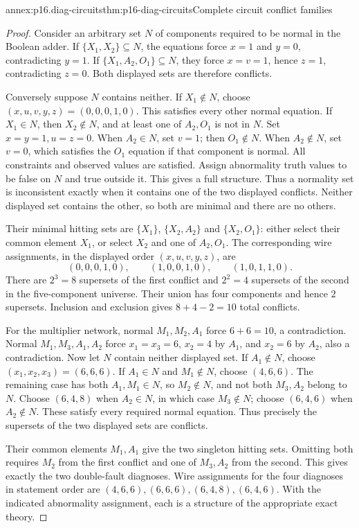 \begin{annexitem}{annex:p16.diag-circuits}{thm:p16-diag-circuits}{Complete circuit conflict families}
\begin{proof}
Consider an arbitrary set \(N\) of components required
to be normal in the Boolean adder. If
\(\{X_1,X_2\}\subseteq N\), the equations force
\(x=1\) and \(y=0\), contradicting \(y=1\).
If \(\{X_1,A_2,O_1\}\subseteq N\), they force
\(x=v=1\), hence \(z=1\), contradicting \(z=0\).
Both displayed sets are therefore conflicts.

Conversely suppose \(N\) contains neither.
If \(X_1\notin N\), choose
\((x,u,v,y,z)=(0,0,0,1,0)\). This satisfies every
other normal equation. If \(X_1\in N\), then
\(X_2\notin N\), and at least one of \(A_2,O_1\)
is not in \(N\). Set \(x=y=1,u=z=0\).
When \(A_2\in N\), set \(v=1\); then \(O_1\notin N\).
When \(A_2\notin N\), set \(v=0\), which satisfies
the \(O_1\) equation if that component is normal.
All constraints and observed values are satisfied.
Assign abnormality truth values to be false on \(N\)
and true outside it. This gives a full structure.
Thus a normality set is inconsistent exactly when
it contains one of the two displayed conflicts.
Neither displayed set contains the other, so both
are minimal and there are no others.

Their minimal hitting sets are \(\{X_1\}\),
\(\{X_2,A_2\}\) and \(\{X_2,O_1\}\):
either select their common element \(X_1\), or
select \(X_2\) and one of \(A_2,O_1\).
The corresponding wire assignments, in the displayed
order \((x,u,v,y,z)\), are
\[
       (0,0,0,1,0),\qquad(1,0,0,1,0),
                           \qquad(1,0,1,1,0).
\]
There are \(2^3=8\) supersets of the first conflict
and \(2^2=4\) supersets of the second in the
five-component universe. Their union has four
components and hence \(2\) supersets. Inclusion
and exclusion gives \(8+4-2=10\) total conflicts.

For the multiplier network, normal
\(M_1,M_2,A_1\) force \(6+6=10\), a contradiction.
Normal \(M_1,M_3,A_1,A_2\) force
\(x_1=x_3=6\), \(x_2=4\) by \(A_1\), and
\(x_2=6\) by \(A_2\), also a contradiction.
Now let \(N\) contain neither displayed set.
If \(A_1\notin N\), choose \((x_1,x_2,x_3)=(6,6,6)\).
If \(A_1\in N\) and \(M_1\notin N\), choose
\((4,6,6)\). The remaining case has both
\(A_1,M_1\in N\), so \(M_2\notin N\), and
not both \(M_3,A_2\) belong to \(N\).
Choose \((6,4,8)\) when \(A_2\in N\), in which
case \(M_3\notin N\); choose \((6,4,6)\)
when \(A_2\notin N\). These satisfy every required
normal equation. Thus precisely the supersets of
the two displayed sets are conflicts.

Their common elements \(M_1,A_1\) give the two
singleton hitting sets. Omitting both requires
\(M_2\) from the first conflict and one of
\(M_3,A_2\) from the second. This gives exactly
the two double-fault diagnoses.
Wire assignments for the four diagnoses in statement
order are \((4,6,6),(6,6,6),(6,4,8),(6,4,6)\).
With the indicated abnormality assignment, each is
a structure of the appropriate exact theory.
\end{proof}
\end{annexitem}

